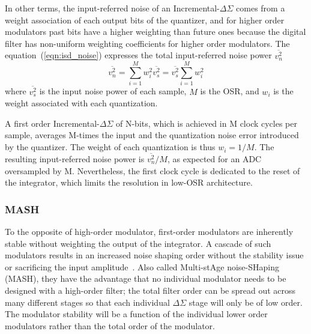 
In other terms, the input-referred noise of an Incremental-\(\Delta\Sigma \) comes from a weight association of each output bits of the quantizer, and for higher order modulators past bits have a higher weighting than future ones because the digital filter has non-uniform weighting coefficients for higher order modulators. The equation~(\ref{eqn:isd_noise}) expresses the total input-referred noise power \(\overline{v_{n}^{2}}\)
\begin{equation}
	\overline{v_{n}^{2}}=\sum_{i=1}^{M}w_{i}^{2}\overline{v_{s}^{2}}=\overline{v_{s}^{2}}\sum_{i=1}^{M}w_{i}^{2}
\label{eqn:isd_noise}
\end{equation}
where \(\overline{v_{s}^{2}}\) is the input noise power of each sample, \(M\) is the OSR, and \(w_i\) is the weight associated with each quantization.

A first order Incremental-\(\Delta \Sigma\) of N-bits, which is achieved in M clock cycles per sample, averages M-times the input and the quantization noise error introduced by the quantizer. The weight of each quantization is thus \(w_i=1/M\). The resulting input-referred noise power is \(\overline{v_{n}^{2}}/M\), as expected for an ADC oversampled by M. Nevertheless, the first clock cycle is dedicated to the reset of the integrator, which limits the resolution in low-OSR architecture.

\subsubsection{MASH}
To the opposite of high-order modulator, first-order modulators are inherently stable without weighting the output of the integrator. A cascade of such modulators results in an increased noise shaping order without the stability issue or sacrificing the input amplitude~\cite{Brooks1997}. Also called Multi-stAge noise-SHaping (MASH), they have the advantage that no individual modulator needs to be designed with a high-order filter; the total filter order can be spread out across many different stages so that each individual \(\Delta\Sigma \) stage will only be of low order. The modulator stability will be a function of the individual lower order modulators rather than the total order of the modulator.

